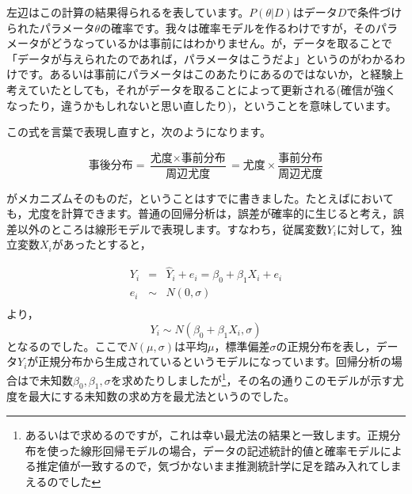 \documentclass{ltjsbook}
\begin{document}
左辺はこの計算の結果得られるを表しています。$P(\theta|D)$はデータ$D$で条件づけられたパラメータ$\theta$の確率です。我々は確率モデルを作るわけですが，そのパラメータがどうなっているかは事前にはわかりません。が，データを取ることで「データが与えられたのであれば，パラメータはこうだよ」というのがわかるわけです。あるいは事前にパラメータはこのあたりにあるのではないか，と経験上考えていたとしても，それがデータを取ることによって更新される(確信が強くなったり，違うかもしれないと思い直したり)，ということを意味しています。

この式を言葉で表現し直すと，次のようになります。

$$ \mbox{事後分布} = \frac{\mbox{尤度}\times \mbox{事前分布}}{\mbox{周辺尤度}} = \mbox{尤度} \times \frac{事前分布}{周辺尤度}$$

がメカニズムそのものだ，ということはすでに書きました。たとえばにおいても，尤度を計算できます。普通の回帰分析は，誤差が確率的に生じると考え，誤差以外のところは線形モデルで表現します。すなわち，従属変数$Y_i$に対して，独立変数$X_i$があったとすると，

\begin{equation*}
    \begin{array}{lll}
        Y_i & =    & \hat{Y}_i + e_i = \beta_0 + \beta_1 X_i + e_i \\
        e_i & \sim & N(0,\sigma)                                   \\
    \end{array}
\end{equation*}
より，
$$ Y_i \sim N(\beta_0 + \beta_1 X_i, \sigma) $$
となるのでした。ここで$N(\mu,\sigma)$は平均$\mu$，標準偏差$\sigma$の正規分布を表し，データ$Y_i$が正規分布から生成されているというモデルになっています。回帰分析の場合はで未知数$\beta_0,\beta_1,\sigma$を求めたりしましたが\footnote{あるいはで求めるのですが，これは幸い最尤法の結果と一致します。正規分布を使った線形回帰モデルの場合，データの記述統計的値と確率モデルによる推定値が一致するので，気づかないまま推測統計学に足を踏み入れてしまえるのでした}，その名の通りこのモデルが示す尤度を最大にする未知数の求め方を最尤法というのでした。
\end{document}
